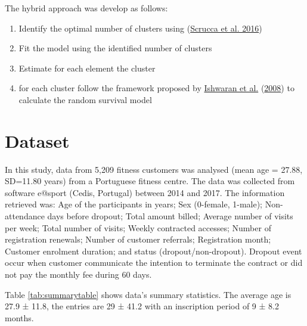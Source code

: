 \documentclass[
  12pt,
]{article}
\providecommand{\tightlist}{%
  \setlength{\itemsep}{0pt}\setlength{\parskip}{0pt}}
\begin{document}
The hybrid approach was develop as follows:

\begin{enumerate}
\def\labelenumi{\arabic{enumi}.}
\tightlist
\item
  Identify the optimal number of clusters using (\protect\hyperlink{ref-scrucca2016}{Scrucca et al. 2016})
\item
  Fit the model using the identified number of clusters
\item
  Estimate for each element the cluster
\item
  for each cluster follow the framework proposed by \protect\hyperlink{ref-Ishwaran_Kogalur_Blackstone_Lauer_2008}{Ishwaran et al.} (\protect\hyperlink{ref-Ishwaran_Kogalur_Blackstone_Lauer_2008}{2008})
  to calculate the random survival model
\end{enumerate}

\hypertarget{dataset}{%
\section{Dataset}\label{dataset}}

In this study, data from 5,209 fitness customers was analysed (mean age = 27.88, SD=11.80 years)
from a Portuguese fitness centre.
The data was collected from software e@sport (Cedis, Portugal) between 2014 and 2017.
The information retrieved was: Age of the participants in years; Sex (0-female, 1-male);
Non-attendance days before dropout; Total amount billed; Average number of visits per week;
Total number of visits; Weekly contracted accesses; Number of registration renewals;
Number of customer referrals; Registration month; Customer enrolment duration; and status
(dropout/non-dropout).
Dropout event occur when customer communicate the intention to terminate the contract or
did not pay the monthly fee during 60 days.

Table \ref{tab:summarytable} shows data's summary statistics. The average age
is 27.9 ±
11.8, the entries are
29 ±
41.2 with an inscription period of
9 ±
8.2 months.
\end{document}
